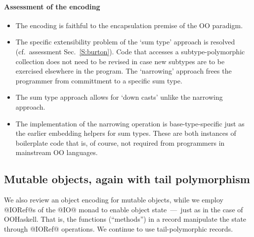 \documentclass{jfp}
\begin{document}
\paragraph{Assessment of the encoding}

\mbox{}

\begin{itemize}

\item
The encoding is faithful to the encapsulation premise of the OO paradigm.

\smallskip

\item
The specific extensibility problem of the `sum type' approach is
resolved (cf.\ assessment Sec.~\ref{S:burton}). Code that accesses a
subtype-polymorphic collection does not need to be revised in case new
subtypes are to be exercised elsewhere in the program. The `narrowing'
approach frees the programmer from committment to a specific sum type.

\smallskip

\item 
The sum type approach allows for `down casts' unlike the narrowing
approach.

\smallskip

\item
The implementation of the narrowing operation is base-type-specific
just as the earlier embedding helpers for sum types. These are
both instances of boilerplate code that is, of course, not required
from programmers in mainstream OO languages.

\end{itemize}






\subsection{Mutable objects, again with tail polymorphism}
\label{S:mutable}

We also review an object encoding for mutable objects, while we employ
@IORef@s of the @IO@ monad to enable object state~---~just as in the
case of OOHaskell. That is, the functions (``methods'') in a record
manipulate the state through @IORef@ operations.  We continue to use
tail-polymorphic records.
\end{document}
